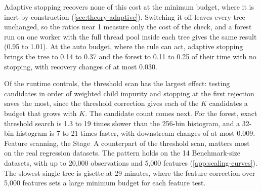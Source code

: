 Adaptive stopping recovers none of this cost at the minimum budget, where it is
inert by construction (\cref{sec:theory-adaptive}). Switching it off leaves
every tree unchanged, so the ratios near 1 measure only the cost of the check,
and a forest run on one worker with the full thread pool inside each tree gives
the same result (0.95 to 1.01). At the auto budget, where the rule can act, adaptive stopping
brings the tree to 0.14 to 0.37 and the forest to 0.11 to 0.25 of their time
with no stopping, with recovery changes of at most 0.030.

Of the runtime controls, the threshold scan has the largest effect: testing
candidates in order of weighted child impurity and stopping at the first
rejection saves the most, since the threshold correction gives each of the $K$
candidates a budget that grows with $K$. The candidate count comes next. For the forest,
exact threshold search is 1.3 to 19 times slower than the 256-bin histogram,
and a 32-bin histogram is 7 to 21 times faster, with downstream changes of at
most 0.009. Feature scanning, the Stage~A
counterpart of the threshold scan, matters most on the real regression
datasets. The pattern holds on the 14 Benchmark-size datasets, with up to 20,000
observations and 5,000 features (\cref{app:scaling-curves}). The slowest single
tree is gisette at 29 minutes, where the feature correction over 5,000 features
sets a large minimum budget for each feature test.
